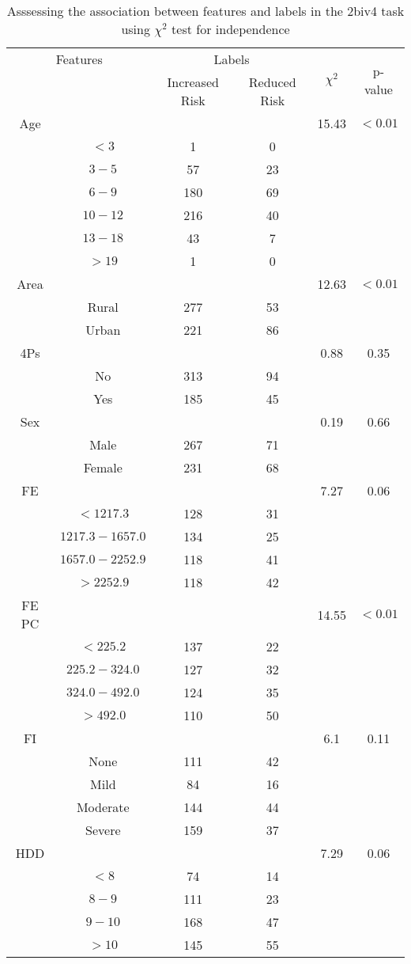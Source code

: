 \begin{table}[!htb]
\centering
\caption{Asssessing the association between features and labels in the 2biv4 task using $\chi^2$ test for independence}
\label{tab:chitest_2biv4}
\begin{tabular}{c c | c c| c | c}
\hline
\multicolumn{2}{c|}{Features}& \multicolumn{2}{c|}{Labels}& \multirow{2}{*}{$\chi^2$} & \multirow{2}{*}{p-value}\\ 
& & Increased Risk & Reduced Risk & & \\ 
\hline
Age &  &  & & 15.43 & $< 0.01$ \\ 
& $< 3$ & 1 & 0& & \\ 
& $3-5$ & 57 & 23& & \\ 
& $6-9$ & 180 & 69& & \\ 
& $10-12$ & 216 & 40& & \\ 
& $13-18$ & 43 & 7& & \\ 
& $> 19$ & 1 & 0& & \\ 
\hline 
Area &  &  & & 12.63 & $< 0.01$ \\ 
& Rural & 277 & 53& & \\ 
& Urban & 221 & 86& & \\ 
\hline 
4Ps &  &  & & 0.88 & 0.35 \\ 
& No & 313 & 94& & \\ 
& Yes & 185 & 45& & \\ 
\hline 
Sex &  &  & & 0.19 & 0.66 \\ 
& Male & 267 & 71& & \\ 
& Female & 231 & 68& & \\ 
\hline 
FE &  &  & & 7.27 & 0.06 \\ 
& $< 1217.3$ & 128 & 31& & \\ 
& $1217.3-1657.0$ & 134 & 25& & \\ 
& $1657.0-2252.9$ & 118 & 41& & \\ 
& $> 2252.9$ & 118 & 42& & \\ 
\hline 
FE PC &  &  & & 14.55 & $< 0.01$ \\ 
& $< 225.2$ & 137 & 22& & \\ 
& $225.2-324.0$ & 127 & 32& & \\ 
& $324.0-492.0$ & 124 & 35& & \\ 
& $> 492.0$ & 110 & 50& & \\ 
\hline 
FI &  &  & & 6.1 & 0.11 \\ 
& None & 111 & 42& & \\ 
& Mild & 84 & 16& & \\ 
& Moderate & 144 & 44& & \\ 
& Severe & 159 & 37& & \\ 
\hline 
HDD &  &  & & 7.29 & 0.06 \\ 
& $< 8$ & 74 & 14& & \\ 
& $8-9$ & 111 & 23& & \\ 
& $9-10$ & 168 & 47& & \\ 
& $> 10$ & 145 & 55& & \\ 
\hline 
\end{tabular}
\end{table}
